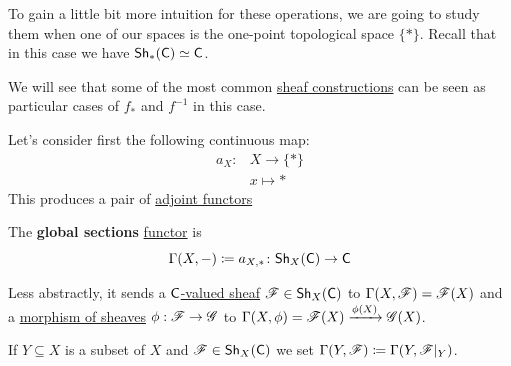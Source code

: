 \documentclass[../../main]{subfiles}
\begin{document}
To gain a little bit more intuition for these operations, we are going to study them when one of our spaces is the one-point topological space \(\{\ast\}\).
Recall that in this case we have \hyperref[ex:one-point-sheaves-are-category]{\(\mathsf{Sh}_{{\ast}}(\mathsf{C}) \simeq \mathsf{C}\)}.

We will see that some of the most common \hyperref[def:sheaf]{sheaf constructions} can be seen as particular cases of \(f_{\ast}\) and \(f^{-1}\) in this case.

Let's consider first the following continuous map:
\begin{align*}
  a_{X}\colon& X \to \{\ast\} \\
        & x \mapsto \ast
\end{align*}
This produces a pair of \hyperref[def:adjoint-functors]{adjoint functors}
\begin{center}
\end{center}

\begin{definition}\label{def:global-sections-sheaf}
  The \textbf{global sections} \hyperref[def:functor]{functor} is
  \begin{equation*}
    \Gamma(X, -) \coloneq a_{X, \ast}\colon \mathsf{Sh}_{X}(\mathsf{C}) \to \mathsf{C}
  \end{equation*}

  Less abstractly, it sends a \hyperref[def:sheaf]{\(\mathsf{C}\)-valued sheaf} \(\mathscr{F} \in \mathsf{Sh}_{X}(\mathsf{C})\) to \(\Gamma(X, \mathscr{F}) = \mathscr{F}(X)\)
  and a \hyperref[def:sheaf]{morphism of sheaves} \(\phi: \mathscr{F} \to \mathscr{G}\) to \(\Gamma(X, \phi) = \mathscr{F}(X) \xrightarrow{\phi(X)} \mathscr{G}(X)\).
\end{definition}

\begin{notation}
  If \(Y \subseteq X\) is a subset of \(X\) and \(\mathscr{F} \in \mathsf{Sh}_{X}(\mathsf{C})\) we set \(\Gamma(Y, \mathscr{F}) \coloneq \Gamma(Y, \mathscr{F}|_{Y})\).
\end{notation}
\end{document}
